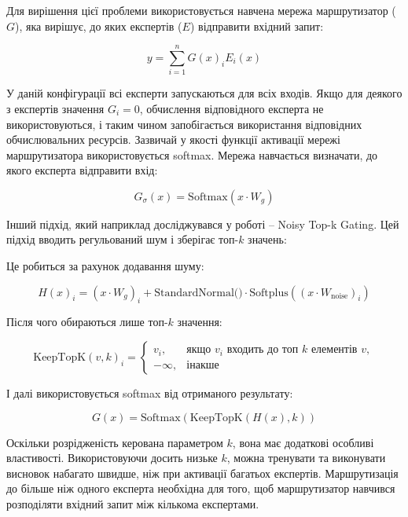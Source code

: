 Для вирішення цієї проблеми використовується навчена мережа маршрутизатор ($G$), яка вирішує, до яких експертів ($E$) відправити вхідний запит:

\begin{equation}
    y = \sum_{i=1}^{n} G(x)_i E_i(x)
\end{equation}

У даній конфігурації всі експерти запускаються для всіх входів. Якщо для деякого з експертів значення $G_i=0$, обчислення відповідного експерта не використовуються, і таким чином запобігається використання відповідних обчислювальних ресурсів. Зазвичай у якості функції активації мережі маршрутизатора використовується softmax. Мережа навчається визначати, до якого експерта відправити вхід:

\begin{equation}
    G_{\sigma}(x) = \text{Softmax}(x \cdot W_g)
\end{equation}

Інший підхід, який наприклад досліджувався у роботі \cite{shazeer2017outrageouslylargeneuralnetworks} -- Noisy Top-k Gating. Цей підхід вводить регульований шум і зберігає топ-$k$ значень:

Це робиться за рахунок додавання шуму:

\begin{equation}
    H(x)_i = (x \cdot W_g)_i + \text{StandardNormal()} \cdot \text{Softplus}((x \cdot W_{\text{noise}})_i)
\end{equation}

Після чого обираються лише топ-$k$ значення:

\begin{equation}
    \text{KeepTopK}(v, k)_i = \begin{cases}
        v_i, & \text{якщо } v_i \text{ входить до топ } k \text{ елементів } v, \\
        -\infty, & \text{інакше}
    \end{cases}
\end{equation}

І далі використовується softmax від отриманого результату:

\begin{equation}
    G(x) = \text{Softmax}(\text{KeepTopK}(H(x), k))
\end{equation}

Оскільки розрідженість керована параметром $k$, вона має додаткові особливі властивості. Використовуючи досить низьке $k$, можна тренувати та виконувати висновок набагато швидше, ніж при активації багатьох експертів. Маршрутизація до більше ніж одного експерта необхідна для того, щоб маршрутизатор навчився розподіляти вхідний запит між кількома експертами.

